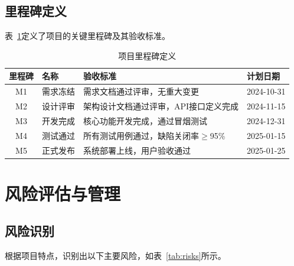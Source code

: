 \subsection{里程碑定义}

表~\ref{tab:milestones}定义了项目的关键里程碑及其验收标准。

\begin{table}[htbp]
    \centering
    \caption{项目里程碑定义}
    \label{tab:milestones}
    \begin{tabular}{clp{5cm}l}
        \toprule
        \textbf{里程碑} & \textbf{名称} & \textbf{验收标准}            & \textbf{计划日期} \\
        \midrule
        M1           & 需求冻结        & 需求文档通过评审，无重大变更           & 2024-10-31    \\
        M2           & 设计评审        & 架构设计文档通过评审，API接口定义完成     & 2024-11-15    \\
        M3           & 开发完成        & 核心功能开发完成，通过冒烟测试          & 2024-12-31    \\
        M4           & 测试通过        & 所有测试用例通过，缺陷关闭率$\geq$95\% & 2025-01-15    \\
        M5           & 正式发布        & 系统部署上线，用户验收通过            & 2025-01-25    \\
        \bottomrule
    \end{tabular}
\end{table}

\section{风险评估与管理}

\subsection{风险识别}

根据项目特点，识别出以下主要风险，如表~\ref{tab:risks}所示。

